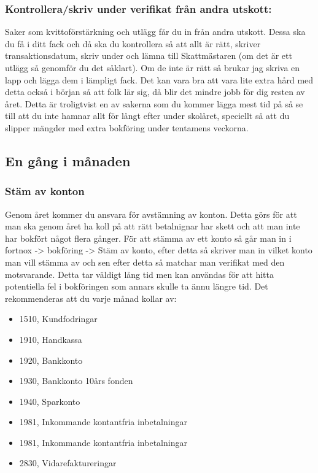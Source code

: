 \documentclass[10pt]{article}
\begin{document}
\subsubsection{Kontrollera/skriv under verifikat från andra utskott:}
Saker som kvittoförstärkning och utlägg får du in från andra utskott. Dessa ska du få i ditt fack och då ska du kontrollera så att allt är rätt, skriver transaktionsdatum, skriv under och lämna till Skattmästaren (om det är ett utlägg så genomför du det såklart). Om de inte är rätt så brukar jag skriva en lapp och lägga dem i lämpligt fack. Det kan vara bra att vara lite extra hård med detta också i början så att folk lär sig, då blir det mindre jobb för dig resten av året. Detta är troligtvist en av sakerna som du kommer lägga mest tid på så se till att du inte hamnar allt för långt efter under skolåret, speciellt så att du slipper mängder med extra bokföring under tentamens veckorna.

\subsection{En gång i månaden}
\subsubsection{Stäm av konton}
Genom året kommer du ansvara för avstämning av konton. Detta görs för att man ska genom året ha koll på att rätt betalnignar har skett och att man inte har bokfört något flera gånger. 
För att stämma av ett konto så går man in i fortnox -> bokföring -> Stäm av konto, efter detta så skriver man in vilket konto man vill stämma av och sen efter detta så matchar man verifikat med den motsvarande.
 Detta tar väldigt lång tid men kan användas för att hitta potentiella fel i bokföringen som annars skulle ta ännu längre tid. 
Det rekommenderas att du varje månad kollar av:

\begin{itemize}
    \item 1510, Kundfodringar
    \item 1910,	Handkassa
    \item 1920,	Bankkonto
    \item 1930,	Bankkonto 10års fonden
    \item 1940,	Sparkonto
    \item 1981,	Inkommande kontantfria inbetalningar
    \item 1981,	Inkommande kontantfria inbetalningar
    \item 2830,	Vidarefaktureringar
\end{itemize}
\end{document}
